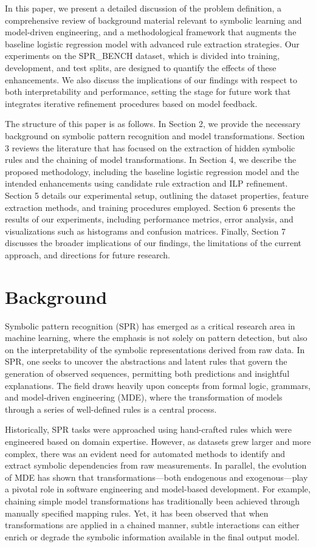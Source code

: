 \documentclass{article}
\begin{document}
In this paper, we present a detailed discussion of the problem definition, a comprehensive review of background material relevant to symbolic learning and model-driven engineering, and a methodological framework that augments the baseline logistic regression model with advanced rule extraction strategies. Our experiments on the SPR\_BENCH dataset, which is divided into training, development, and test splits, are designed to quantify the effects of these enhancements. We also discuss the implications of our findings with respect to both interpretability and performance, setting the stage for future work that integrates iterative refinement procedures based on model feedback.

The structure of this paper is as follows. In Section 2, we provide the necessary background on symbolic pattern recognition and model transformations. Section 3 reviews the literature that has focused on the extraction of hidden symbolic rules and the chaining of model transformations. In Section 4, we describe the proposed methodology, including the baseline logistic regression model and the intended enhancements using candidate rule extraction and ILP refinement. Section 5 details our experimental setup, outlining the dataset properties, feature extraction methods, and training procedures employed. Section 6 presents the results of our experiments, including performance metrics, error analysis, and visualizations such as histograms and confusion matrices. Finally, Section 7 discusses the broader implications of our findings, the limitations of the current approach, and directions for future research.

\section{Background}
Symbolic pattern recognition (SPR) has emerged as a critical research area in machine learning, where the emphasis is not solely on pattern detection, but also on the interpretability of the symbolic representations derived from raw data. In SPR, one seeks to uncover the abstractions and latent rules that govern the generation of observed sequences, permitting both predictions and insightful explanations. The field draws heavily upon concepts from formal logic, grammars, and model-driven engineering (MDE), where the transformation of models through a series of well-defined rules is a central process.

Historically, SPR tasks were approached using hand-crafted rules which were engineered based on domain expertise. However, as datasets grew larger and more complex, there was an evident need for automated methods to identify and extract symbolic dependencies from raw measurements. In parallel, the evolution of MDE has shown that transformations—both endogenous and exogenous—play a pivotal role in software engineering and model-based development. For example, chaining simple model transformations has traditionally been achieved through manually specified mapping rules. Yet, it has been observed that when transformations are applied in a chained manner, subtle interactions can either enrich or degrade the symbolic information available in the final output model.
\end{document}
